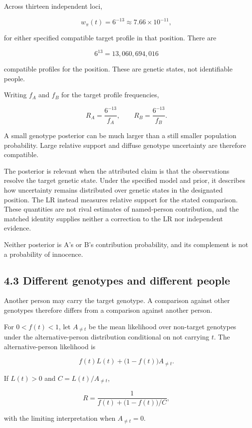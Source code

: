 \documentclass[
]{article}
\begin{document}
Across thirteen independent loci,

\[
w_\pi(t)=6^{-13}\approx7.66\times10^{-11},
\]

for either specified compatible target profile in that position. There
are

\[
6^{13}=13{,}060{,}694{,}016
\]

compatible profiles for the position. These are genetic states, not
identifiable people.

Writing \(f_A\) and \(f_B\) for the target profile frequencies,

\[
R_A=\frac{6^{-13}}{f_A},
\qquad
R_B=\frac{6^{-13}}{f_B}.
\]

A small genotype posterior can be much larger than a still smaller
population probability. Large relative support and diffuse genotype
uncertainty are therefore compatible.

The posterior is relevant when the attributed claim is that the
observations resolve the target genetic state. Under the specified model
and prior, it describes how uncertainty remains distributed over genetic
states in the designated position. The LR instead measures relative
support for the stated comparison. These quantities are not rival
estimates of named-person contribution, and the matched identity
supplies neither a correction to the LR nor independent evidence.

Neither posterior is A's or B's contribution probability, and its
complement is not a probability of innocence.

\subsection{4.3 Different genotypes and different
people}\label{different-genotypes-and-different-people}

Another person may carry the target genotype. A comparison against other
genotypes therefore differs from a comparison against another person.

For \(0<f(t)<1\), let \(A_{\ne t}\) be the mean likelihood over
non-target genotypes under the alternative-person distribution
conditional on not carrying \(t\). The alternative-person likelihood is

\[
f(t)L(t)+\bigl(1-f(t)\bigr)A_{\ne t}.
\]

If \(L(t)>0\) and \(C=L(t)/A_{\ne t}\),

\[
R=
\frac{1}{f(t)+\bigl(1-f(t)\bigr)/C},
\]

with the limiting interpretation when \(A_{\ne t}=0\).
\end{document}
